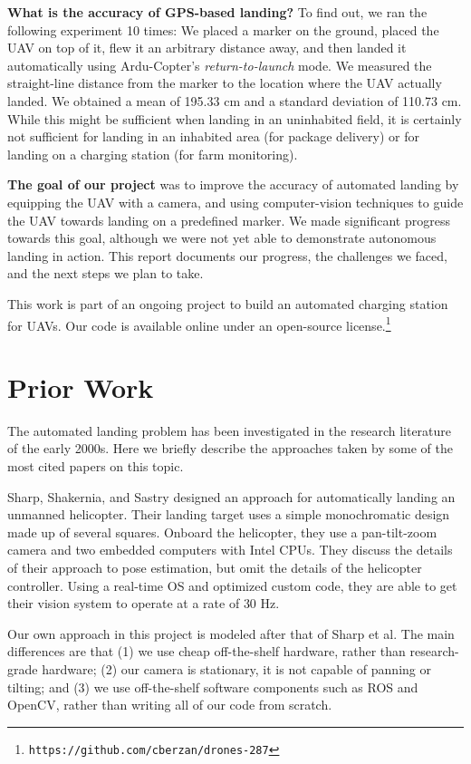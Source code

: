 \documentclass[10pt]{scrartcl} %
\begin{document}
{\bf What is the accuracy of GPS-based landing?} To find out, we ran the
following experiment 10 times: We placed a marker on the ground, placed the UAV
on top of it, flew it an arbitrary distance away, and then landed it
automatically using Ardu-Copter's \textit{return-to-launch} mode. We measured
the straight-line distance from the marker to the location where the UAV
actually landed. We obtained a mean of 195.33 cm and a standard deviation of
110.73 cm. While this might be sufficient when landing in an uninhabited field,
it is certainly not sufficient for landing in an inhabited area (for package
delivery) or for landing on a charging station (for farm monitoring).

{\bf The goal of our project} was to improve the accuracy of automated landing
by equipping the UAV with a camera, and using computer-vision techniques to
guide the UAV towards landing on a predefined marker. We made significant
progress towards this goal, although we were not yet able to demonstrate
autonomous landing in action. This report documents our progress, the
challenges we faced, and the next steps we plan to take.

This work is part of an ongoing project to build an automated charging station
for UAVs. Our code is available online under an open-source
license.\footnote{{\tt https://github.com/cberzan/drones-287}}


\section{Prior Work}

The automated landing problem has been investigated in the research literature
of the early 2000s. Here we briefly describe the approaches taken by some of
the most cited papers on this topic.

Sharp, Shakernia, and Sastry \cite{sharp_et_al_2001} designed an approach for
automatically landing an unmanned helicopter. Their landing target uses a
simple monochromatic design made up of several squares. Onboard the helicopter,
they use a pan-tilt-zoom camera and two embedded computers with Intel CPUs.
They discuss the details of their approach to pose estimation, but omit the
details of the helicopter controller. Using a real-time OS and optimized custom
code, they are able to get their vision system to operate at a rate of 30 Hz.

Our own approach in this project is modeled after that of Sharp et al. The main
differences are that (1) we use cheap off-the-shelf hardware, rather than
research-grade hardware; (2) our camera is stationary, it is not capable of
panning or tilting; and (3) we use off-the-shelf software components such as
ROS and OpenCV, rather than writing all of our code from scratch.
\end{document}
